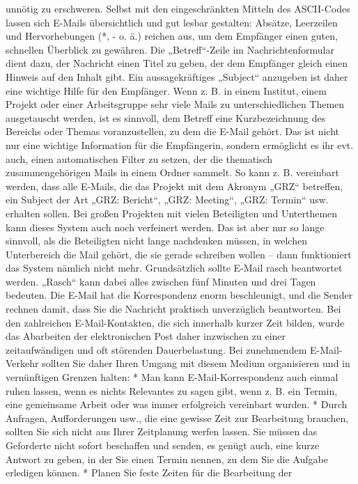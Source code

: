 \documentclass[]{book}
\theoremstyle{definition}
\theoremstyle{definition}
\theoremstyle{definition}
\theoremstyle{remark}
\begin{document}
unnötig zu erschweren. Selbst mit den eingeschränkten Mitteln des
ASCII-Codes lassen sich E-Mails übersichtlich und gut lesbar gestalten:
Absätze, Leerzeilen und Hervorhebungen (*, - o. ä.) reichen aus, um dem
Empfänger einen guten, schnellen Überblick zu gewähren. Die
„Betreff``-Zeile im Nachrichtenformular dient dazu, der Nachricht einen
Titel zu geben, der dem Empfänger gleich einen Hinweis auf den Inhalt
gibt. Ein aussagekräftiges „Subject`` anzugeben ist daher eine wichtige
Hilfe für den Empfänger. Wenn z. B. in einem Institut, einem Projekt
oder einer Arbeitsgruppe sehr viele Mails zu unterschiedlichen Themen
ausgetauscht werden, ist es sinnvoll, dem Betreff eine Kurzbezeichnung
des Bereichs oder Themas voranzustellen, zu dem die E-Mail gehört. Das
ist nicht nur eine wichtige Information für die Empfängerin, sondern
ermöglicht es ihr evt. auch, einen automatischen Filter zu setzen, der
die thematisch zusammengehörigen Mails in einem Ordner sammelt. So kann
z. B. vereinbart werden, dass alle E-Mails, die das Projekt mit dem
Akronym „GRZ`` betreffen, ein Subject der Art „GRZ: Bericht``, „GRZ:
Meeting``, „GRZ: Termin`` usw. erhalten sollen. Bei großen Projekten mit
vielen Beteiligten und Unterthemen kann dieses System auch noch
verfeinert werden. Das ist aber nur so lange sinnvoll, als die
Beteiligten nicht lange nachdenken müssen, in welchen Unterbereich die
Mail gehört, die sie gerade schreiben wollen -- dann funktioniert das
System nämlich nicht mehr. Grundsätzlich sollte E-Mail rasch beantwortet
werden. „Rasch`` kann dabei alles zwischen fünf Minuten und drei Tagen
bedeuten. Die E-Mail hat die Korrespondenz enorm beschleunigt, und die
Sender rechnen damit, dass Sie die Nachricht praktisch unverzüglich
beantworten. Bei den zahlreichen E-Mail-Kontakten, die sich innerhalb
kurzer Zeit bilden, wurde das Abarbeiten der elektronischen Post daher
inzwischen zu einer zeitaufwändigen und oft störenden Dauerbelastung.
Bei zunehmendem E-Mail-Verkehr sollten Sie daher Ihren Umgang mit diesem
Medium organisieren und in vernünftigen Grenzen halten: * Man kann
E-Mail-Korrespondenz auch einmal ruhen lassen, wenn es nichts Relevantes
zu sagen gibt, wenn z. B. ein Termin, eine gemeinsame Arbeit oder was
immer erfolgreich vereinbart wurden. * Durch Anfragen, Aufforderungen
usw., die eine gewisse Zeit zur Bearbeitung brauchen, sollten Sie sich
nicht aus Ihrer Zeitplanung werfen lassen. Sie müssen das Geforderte
nicht sofort beschaffen und senden, es genügt auch, eine kurze Antwort
zu geben, in der Sie einen Termin nennen, zu dem Sie die Aufgabe
erledigen können. * Planen Sie feste Zeiten für die Bearbeitung der
\end{document}
